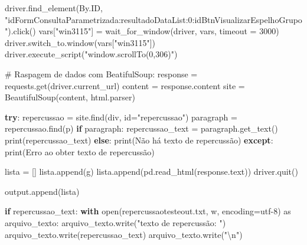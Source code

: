 \documentclass[
  brazilian,
  letterpaper,
  DIV=11,
  numbers=noendperiod]{scrartcl}
\newenvironment{Shaded}{\begin{snugshade}}{\end{snugshade}}
\newcommand{\BuiltInTok}[1]{\textcolor[rgb]{0.00,0.23,0.31}{#1}}
\newcommand{\CharTok}[1]{\textcolor[rgb]{0.13,0.47,0.30}{#1}}
\newcommand{\CommentTok}[1]{\textcolor[rgb]{0.37,0.37,0.37}{#1}}
\newcommand{\ControlFlowTok}[1]{\textcolor[rgb]{0.00,0.23,0.31}{\textbf{#1}}}
\newcommand{\DecValTok}[1]{\textcolor[rgb]{0.68,0.00,0.00}{#1}}
\newcommand{\ImportTok}[1]{\textcolor[rgb]{0.00,0.46,0.62}{#1}}
\newcommand{\NormalTok}[1]{\textcolor[rgb]{0.00,0.23,0.31}{#1}}
\newcommand{\OperatorTok}[1]{\textcolor[rgb]{0.37,0.37,0.37}{#1}}
\newcommand{\StringTok}[1]{\textcolor[rgb]{0.13,0.47,0.30}{#1}}
\begin{document}
\begin{Shaded}
\begin{Highlighting}[numbers=left,,]
\NormalTok{    driver.find\_element(By.ID, }\StringTok{"idFormConsultaParametrizada:resultadoDataList:0:idBtnVisualizarEspelhoGrupo"}\NormalTok{).click()}
    \BuiltInTok{vars}\NormalTok{[}\StringTok{"win3115"}\NormalTok{] }\OperatorTok{=}\NormalTok{ wait\_for\_window(driver, }\BuiltInTok{vars}\NormalTok{, timeout }\OperatorTok{=} \DecValTok{3000}\NormalTok{)}
\NormalTok{    driver.switch\_to.window(}\BuiltInTok{vars}\NormalTok{[}\StringTok{"win3115"}\NormalTok{])}
\NormalTok{    driver.execute\_script(}\StringTok{"window.scrollTo(0,306)"}\NormalTok{)}


    \CommentTok{\# Raspagem de dados com BeatifulSoup:}
\NormalTok{    response }\OperatorTok{=}\NormalTok{ requests.get(driver.current\_url)}
\NormalTok{    content }\OperatorTok{=}\NormalTok{ response.content}
\NormalTok{    site }\OperatorTok{=}\NormalTok{ BeautifulSoup(content, }\StringTok{\textquotesingle{}html.parser\textquotesingle{}}\NormalTok{)}

    \ControlFlowTok{try}\NormalTok{:}
\NormalTok{        repercussao }\OperatorTok{=}\NormalTok{ site.find(}\StringTok{\textquotesingle{}div\textquotesingle{}}\NormalTok{, }\BuiltInTok{id}\OperatorTok{=}\StringTok{"repercussao"}\NormalTok{)}
\NormalTok{        paragraph }\OperatorTok{=}\NormalTok{ repercussao.find(}\StringTok{\textquotesingle{}p\textquotesingle{}}\NormalTok{)}
        \ControlFlowTok{if}\NormalTok{ paragraph:}
\NormalTok{            repercussao\_text }\OperatorTok{=}\NormalTok{ paragraph.get\_text()}
            \BuiltInTok{print}\NormalTok{(repercussao\_text)}
        \ControlFlowTok{else}\NormalTok{:}
            \BuiltInTok{print}\NormalTok{(}\StringTok{\textquotesingle{}Não há texto de repercussão\textquotesingle{}}\NormalTok{)}
    \ControlFlowTok{except}\NormalTok{:}
        \BuiltInTok{print}\NormalTok{(}\StringTok{\textquotesingle{}Erro ao obter texto de repercussão\textquotesingle{}}\NormalTok{)}
             
\NormalTok{    lista }\OperatorTok{=}\NormalTok{ []}
\NormalTok{    lista.append(g)}
\NormalTok{    lista.append(pd.read\_html(response.text))}
\NormalTok{    driver.quit()}
    
\NormalTok{    output.append(lista)}

\ControlFlowTok{if}\NormalTok{ repercussao\_text:}
    \ControlFlowTok{with} \BuiltInTok{open}\NormalTok{(}\StringTok{\textquotesingle{}repercussaotesteout.txt\textquotesingle{}}\NormalTok{, }\StringTok{\textquotesingle{}w\textquotesingle{}}\NormalTok{, encoding}\OperatorTok{=}\StringTok{\textquotesingle{}utf{-}8\textquotesingle{}}\NormalTok{) }\ImportTok{as}\NormalTok{ arquivo\_texto:}
\NormalTok{        arquivo\_texto.write(}\StringTok{"texto de repercussão: "}\NormalTok{)}
\NormalTok{        arquivo\_texto.write(repercussao\_text)}
\NormalTok{        arquivo\_texto.write(}\StringTok{"}\CharTok{\textbackslash{}n}\StringTok{"}\NormalTok{)}
    

\end{Highlighting}
\end{Shaded}
\end{document}
